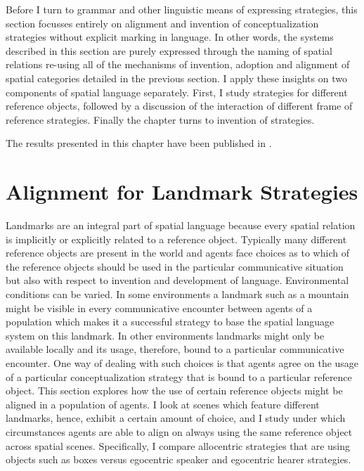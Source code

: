 Before I turn to grammar and other 
linguistic means of expressing strategies, this section focusses entirely 
on alignment and invention of conceptualization strategies 
without explicit marking in language. In other words, the systems described in
this section are purely expressed through the naming of spatial relations
re-using all of the mechanisms of invention, adoption and alignment of
spatial categories detailed in the previous section. I apply these
insights on two components of spatial language separately. First,
I study strategies for different reference objects, followed by a discussion of 
the interaction of different frame of reference strategies. Finally the chapter
turns to invention of strategies.

The results presented in this chapter have been published in 
\cite{spranger2011recruitment,spranger2013evolving}.

\section{Alignment for Landmark Strategies}
Landmarks are an integral part of spatial language
because every spatial relation is implicitly or explicitly related to a reference object.
Typically many different reference objects are present in the world and agents
face choices as to which of the reference objects should be used
in the particular communicative situation but also with respect to invention
and development of language. Environmental conditions can be varied.
In some environments a landmark such as a mountain might be visible in every communicative
encounter between agents of a population which makes it a successful strategy to 
base the spatial language system on this landmark. In other environments
landmarks might only be available locally and its usage, therefore, bound to a particular
communicative encounter. One way of dealing with such choices is that
agents agree on the usage of a particular conceptualization strategy that is 
bound to a particular reference object. This section explores how the use of certain 
reference objects might be aligned in a population of agents. I look at scenes
which feature different landmarks, hence, exhibit a certain amount of choice,
and I study under which circumstances agents are able to align on always using 
the same reference object across spatial scenes. Specifically,
I compare allocentric strategies that are using objects such as boxes
versus egocentric speaker and egocentric hearer strategies. 

